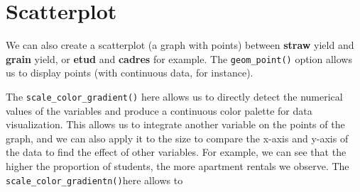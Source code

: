 \documentclass[
  letterpaper,
  DIV=11,
  numbers=noendperiod]{scrreprt}
\begin{document}
\section{Scatterplot}\label{scatterplot}

We can also create a scatterplot (a graph with points) between
\textbf{straw} yield and \textbf{grain} yield, or \textbf{etud} and
\textbf{cadres} for example. The \texttt{geom\_point()} option allows us
to display points (with continuous data, for instance).

The \texttt{scale\_color\_gradient()} here allows us to directly detect
the numerical values of the variables and produce a continuous color
palette for data visualization. This allows us to integrate another
variable on the points of the graph, and we can also apply it to the
size to compare the x-axis and y-axis of the data to find the effect of
other variables. For example, we can see that the higher the proportion
of students, the more apartment rentals we observe. The
\texttt{scale\_color\_gradientn()}here allows to
\end{document}
